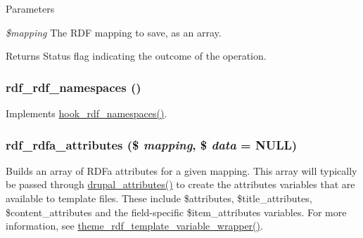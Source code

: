 \begin{DoxyParams}{Parameters}
\item[{\em \$mapping}]The RDF mapping to save, as an array.\end{DoxyParams}
\begin{DoxyReturn}{Returns}
Status flag indicating the outcome of the operation. 
\end{DoxyReturn}
\hypertarget{group__rdf_gaed65d375e129af058947c2d614eb1d3c}{
\subsubsection[{rdf\_\-rdf\_\-namespaces}]{\setlength{\rightskip}{0pt plus 5cm}rdf\_\-rdf\_\-namespaces ()}}
\label{group__rdf_gaed65d375e129af058947c2d614eb1d3c}
Implements \hyperlink{group__rdf_ga32e59c5e172304a5f49ec7d76ee6bf3b}{hook\_\-rdf\_\-namespaces()}. \hypertarget{group__rdf_ga9b02589c8277c732de8c035d5a606de9}{
\subsubsection[{rdf\_\-rdfa\_\-attributes}]{\setlength{\rightskip}{0pt plus 5cm}rdf\_\-rdfa\_\-attributes (\$ {\em mapping}, \/  \$ {\em data} = {\ttfamily NULL})}}
\label{group__rdf_ga9b02589c8277c732de8c035d5a606de9}
Builds an array of RDFa attributes for a given mapping. This array will typically be passed through \hyperlink{group__sanitization_gacf11629fb3d1ebf200863e2d15380b4a}{drupal\_\-attributes()} to create the attributes variables that are available to template files. These include \$attributes, \$title\_\-attributes, \$content\_\-attributes and the field-\/specific \$item\_\-attributes variables. For more information, see \hyperlink{group__rdf_ga3bb0346c634262f7b193957cc26d38ca}{theme\_\-rdf\_\-template\_\-variable\_\-wrapper()}.


